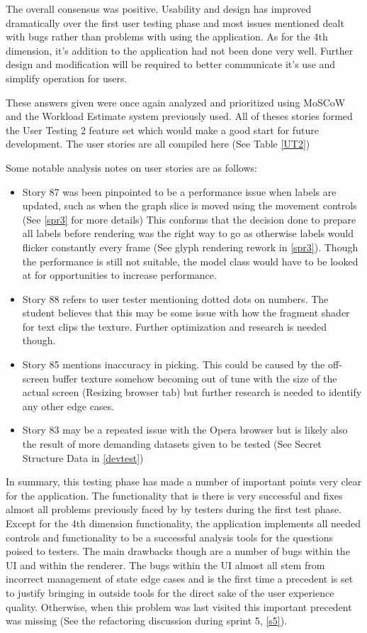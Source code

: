 The overall consensus was positive. Usability and design has improved dramatically over the first user testing phase and most issues mentioned dealt with bugs rather than problems with using the application. As for the 4th dimension, it's addition to the application had not been done very well. Further design and modification will be required to better communicate it's use and simplify operation for users.

These answers given were once again analyzed and prioritized using MoSCoW and the Workload Estimate system previously used. All of theses stories formed the User Testing 2 feature set which would make a good start for future development.
The user stories are all compiled here (See Table \ref{UT2})

Some notable analysis notes on user stories are as follows:
\begin{itemize}
    \item Story 87 was been pinpointed to be a performance issue when labels are updated, such as when the graph slice is moved using the movement controls (See \ref{spr3} for more details) This conforms that the decision done to prepare all labels before rendering was the right way to go as otherwise labels would flicker constantly every frame (See glyph rendering rework in \ref{spr3}). Though the performance is still not suitable, the model class would have to be looked at for opportunities to increase performance.
    \item Story 88 refers to user tester mentioning dotted dots on numbers. The student believes that this may be some issue with how the fragment shader for text clips the texture. Further optimization and research is needed though.
    \item Story 85 mentions inaccuracy in picking. This could be caused by the off-screen buffer texture somehow becoming out of tune with the size of the actual screen (Resizing browser tab) but further research is needed to identify any other edge cases.
    \item Story 83 may be a repeated issue with the Opera browser but is likely also the result of more demanding datasets given to be tested (See Secret Structure Data in \ref{devtest})
\end{itemize}

In summary, this testing phase has made a number of important points very clear for the application. The functionality that is there is very successful and fixes almost all problems previously faced by by testers during the first test phase. Except for the 4th dimension functionality, the application implements all needed controls and functionality to be a successful analysis tools for the questions poised to testers. The main drawbacks though are a number of bugs within the UI and within the renderer. The bugs within the UI almost all stem from incorrect management of state edge cases and is the first time a precedent is set to justify bringing in outside tools for the direct sake of the user experience quality. Otherwise, when this problem was last visited this important precedent was missing (See the refactoring discussion during sprint 5, \ref{s5}).

